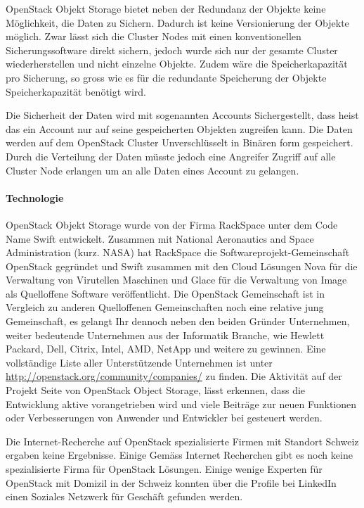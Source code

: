 OpenStack Objekt Storage bietet neben der Redundanz der Objekte keine Möglichkeit, die Daten zu Sichern. Dadurch ist keine Versionierung der Objekte möglich. Zwar lässt sich die Cluster Nodes mit einen konventionellen Sicherungssoftware direkt sichern, jedoch wurde sich nur der gesamte Cluster wiederherstellen und nicht einzelne Objekte. Zudem wäre die Speicherkapazität pro Sicherung, so gross wie es für die redundante Speicherung der Objekte Speicherkapazität benötigt wird. \cite{AndyBrezinsky2011}


Die Sicherheit der Daten wird mit sogenannten Accounts Sichergestellt, dass heist das ein Account nur auf seine gespeicherten Objekten zugreifen kann. Die Daten werden auf dem OpenStack Cluster Unverschlüsselt in Binären form gespeichert. Durch die Verteilung der Daten müsste jedoch eine Angreifer Zugriff auf alle Cluster Node erlangen um an alle Daten eines Account zu gelangen.

\paragraph*{Technologie}
OpenStack Objekt Storage wurde von der Firma RackSpace unter dem Code Name Swift entwickelt. Zusammen mit National Aeronautics and Space Administration (kurz. NASA) hat RackSpace die Softwareprojekt-Gemeinschaft OpenStack gegründet und Swift zusammen mit den Cloud Lösungen Nova für die Verwaltung von Virutellen Maschinen und Glace für die Verwaltung von Image als Quelloffene Software veröffentlicht. Die OpenStack Gemeinschaft ist in Vergleich zu anderen Quelloffenen Gemeinschaften noch eine relative jung Gemeinschaft, es gelangt Ihr dennoch neben den beiden Gründer Unternehmen, weiter bedeutende Unternehmen aus der Informatik Branche, wie Hewlett Packard, Dell, Citrix, Intel, AMD, NetApp und weitere zu gewinnen. Eine vollständige Liste aller Unterstützende  Unternehmen ist unter \url{http://openstack.org/community/companies/} zu finden. Die Aktivität auf der Projekt Seite von OpenStack Object Storage, lässt erkennen, dass die Entwicklung aktive vorangetrieben wird und viele Beiträge zur neuen Funktionen oder Verbesserungen von Anwender und Entwickler bei gesteuert werden. \cite{Ohloh2012}

Die Internet-Recherche auf OpenStack spezialisierte Firmen mit Standort Schweiz ergaben keine Ergebnisse. Einige
Gemäss Internet Recherchen gibt es noch keine spezialisierte Firma für OpenStack Lösungen. Einige wenige Experten für OpenStack mit Domizil in der Schweiz konnten über die Profile bei LinkedIn einen Soziales Netzwerk für Geschäft gefunden werden. 

